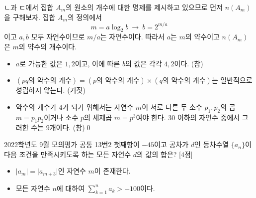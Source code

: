 \documentclass{article}
\begin{document}
\begin{sol}
	ㄴ과 ㄷ에서 집합 $A_m$의 원소의 개수에 대한 명제를 제시하고 있으므로 먼저 $n(A_m)$을 구해보자. 집합 $A_m$의 정의에서
	\[
		m=a\log_2b~\longrightarrow~b=2^{m/a}
	\]
	이고 $a,b$ 모두 자연수이므로 $m/a$는 자연수이다. 따라서 $a$는 $m$의 약수이고 $n(A_m)$은 $m$의 약수의 개수이다.
	\begin{itemize}
		\item[ㄱ.] $a$로 가능한 값은 $1,2$이고, 이에 따른 $b$의 값은 각각 $4,2$이다. (참)
		\item[ㄴ.] $(pq\text{의 약수의 개수})=(p\text{의 약수의 개수})\times(q\text{의 약수의 개수})$는 일반적으로 성립하지 않는다. (거짓)
		\item[ㄷ.] 약수의 개수가 $4$가 되기 위해서는 자연수 $m$이 서로 다른 두 소수 $p_1,p_2$의 곱 $m=p_1p_2$이거나 소수 $p$의 세제곱 $m=p^3$여야 한다. $30$ 이하의 자연수 중에서 그러한 수는 $9$개이다. (참)\qed
	\end{itemize}
\end{sol}

\newpage
\begin{prob}{2022학년도 9월 모의평가 공통 13번}{2}
	첫째항이 $-45$이고 공차가 $d$인 등차수열 $\{a_n\}$이 다음 조건을 만족시키도록 하는 모든 자연수 $d$의 값의 합은? [4점]
	\begin{hint}
		\begin{itemize}
			\item[(가)] $\vert a_m\vert=\vert a_{m+3}\vert$인 자연수 $m$이 존재한다.
			\item[(나)] 모든 자연수 $n$에 대하여 $\displaystyle\sum_{k=1}^na_k>-100$이다.
		\end{itemize}
	\end{hint}
\end{prob}
\end{document}
